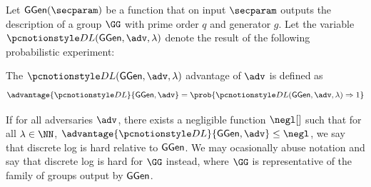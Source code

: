 Let $\groupgen(\secparam)$ be a function that on input $\secparam$ outputs the description of a group $\GG$ with prime order $q$ and generator $g$.
Let the variable $\dl(\groupgen, \adv, \secpar)$ denote the result of the following probabilistic experiment:


The $\dl(\groupgen, \adv, \secpar)$ advantage of $\adv$ is defined as
$$
	\advantage{\dl}{\groupgen, \adv} = \prob{\dl(\groupgen, \adv, \secpar) \Rightarrow 1}
$$

If for all adversaries $\adv$, there exists a negligible function $\negl[]$ such that for all $\secpar \in \NN$, $\advantage{\dl}{\groupgen, \adv} \allowbreak\leq\allowbreak \negl$, we say that discrete log is hard relative to $\mathsf{GGen}$.
We may ocasionally abuse notation and say that discrete log is hard for $\GG$ instead, where $\GG$ is representative of the family of groups output by $\mathsf{GGen}$.
